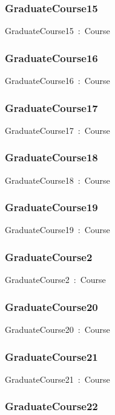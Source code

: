 \documentclass{article}
\begin{document}
\subsubsection*{GraduateCourse15}

GraduateCourse15~:~Course

\subsubsection*{GraduateCourse16}

GraduateCourse16~:~Course

\subsubsection*{GraduateCourse17}

GraduateCourse17~:~Course

\subsubsection*{GraduateCourse18}

GraduateCourse18~:~Course

\subsubsection*{GraduateCourse19}

GraduateCourse19~:~Course

\subsubsection*{GraduateCourse2}

GraduateCourse2~:~Course

\subsubsection*{GraduateCourse20}

GraduateCourse20~:~Course

\subsubsection*{GraduateCourse21}

GraduateCourse21~:~Course

\subsubsection*{GraduateCourse22}
\end{document}
